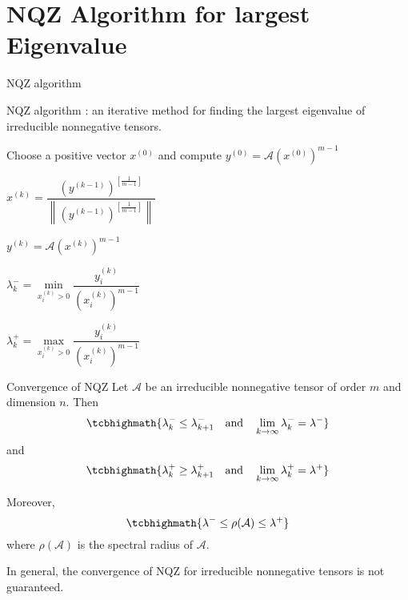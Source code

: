 \documentclass[10pt,compress,t,noamsthm,notheorem,table,handout]{beamer}
\theoremstyle{nonumberbreak}%
\newcommand{\myem}[2][blue]{{\color{#1} #2}}
\newcommand{\lam}{\lambda}
\newcommand{\mycite}[1]{\textcolor{red}{\normalfont\upshape{#1}}}
\newcommand{\A}{\mathcal{A}}
\begin{document}
\section{NQZ Algorithm for largest Eigenvalue}
\begin{frame}{NQZ algorithm}

NQZ algorithm \mycite{[NQZ '09]} : an iterative method for finding
the largest eigenvalue of irreducible nonnegative tensors.

\begin{Block}\linespread{1.5}\selectfont
  \begin{algorithmic}[1]
  \State Choose a \myem{positive} vector $x^{(0)}$ and compute
     $y^{(0)}=\A (x^{(0)})^{m-1}$

  \State $x^{(k)}=\dfrac{\left(y^{(k-1)}\right)^{[\frac1{m-1}]}}%
                          {\left\|\left(y^{(k-1)}\right)^{[\frac1{m-1}]}\right\|}$

  \State $y^{(k)}=\A (x^{(k)})^{m-1}$

  \State $\lam^-_{k}=\min\limits_{x^{(k)}_i>0}
    \dfrac{y^{(k)}_i}{\left(x^{(k)}_i\right)^{m-1}}$

  \State $\lam^+_{k}=\max\limits_{x^{(k)}_i>0}
    \dfrac{y^{(k)}_i}{\left(x^{(k)}_i\right)^{m-1}}$

  \EndFor
  \end{algorithmic}
\end{Block}

\end{frame}

\begin{frame}{Convergence of NQZ}
  Let $\A$ be an \myem{irreducible nonnegative} tensor of order $m$ and dimension $n$.
  Then
  $$
    \tcbhighmath{\lam^-_k\leq \lam^-_{k+1} \quad\text{and}\quad
     \lim_{k\to\infty} \lam^-_k = \lam^-}
  $$
  and
  $$
    \tcbhighmath{\lam^+_k\geq \lam^+_{k+1} \quad\text{and}\quad
     \lim_{k\to\infty} \lam^+_k = \lam^+}
  $$

  Moreover,
  $$ \tcbhighmath{\lam^- \leq \rho(\A) \leq \lam^+} $$
  where $\rho(\A)$ is the spectral radius  of $\A$.

  \begin{notebox}
    In general, the convergence of NQZ for irreducible nonnegative tensors
    is not guaranteed.
  \end{notebox}

\end{frame}
\end{document}

